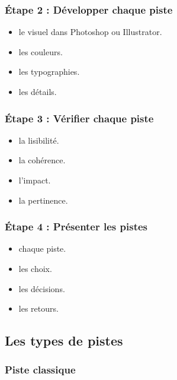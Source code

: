 \subsubsection{Étape 2 : Développer chaque piste}

\begin{itemize}
    \item {} le visuel dans Photoshop ou Illustrator.
    \item {} les couleurs.
    \item {} les typographies.
    \item {} les détails.
\end{itemize}

\subsubsection{Étape 3 : Vérifier chaque piste}

\begin{itemize}
    \item {} la lisibilité.
    \item {} la cohérence.
    \item {} l'impact.
    \item {} la pertinence.
\end{itemize}

\subsubsection{Étape 4 : Présenter les pistes}

\begin{itemize}
    \item {} chaque piste.
    \item {} les choix.
    \item {} les décisions.
    \item {} les retours.
\end{itemize}

\subsection{Les types de pistes}

\subsubsection{Piste classique}

